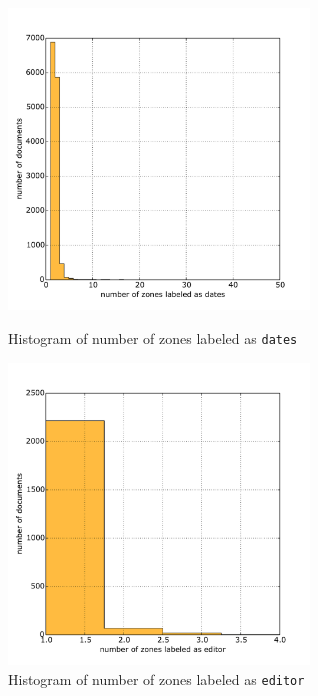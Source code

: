 \begin{appendix}
\begin{figure}
\centering
\begin{minipage}[t!]{0.48\linewidth}
  \includegraphics[width=8cm]{plots/dates_histogram}
  \caption{Histogram of number of zones labeled as \texttt{dates}}
  \label{fig:dates_histogram}
\end{minipage}
\quad
\begin{minipage}[t!]{0.48\linewidth}
  \includegraphics[width=8cm]{plots/editor_histogram}
  \caption{Histogram of number of zones labeled as \texttt{editor}}
  \label{fig:editor_histogram}
\end{minipage}
\end{figure}


\end{appendix}
